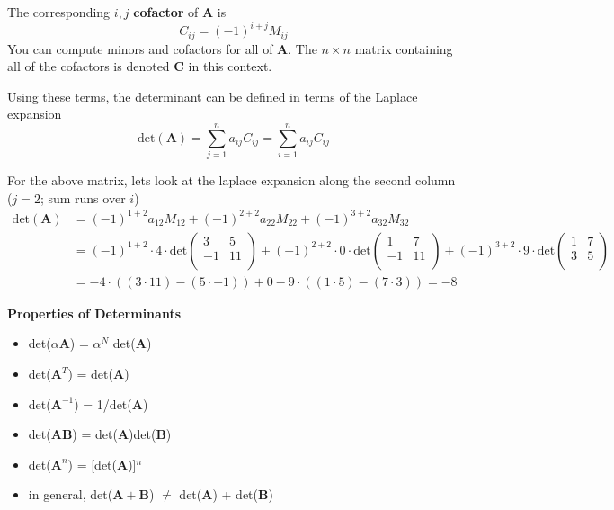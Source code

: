 \documentclass[12pt]{article}
\newcommand{\ve}[1]{\ensuremath{\mathbf{#1}}}
\begin{document}
The corresponding $i,j$ \textbf{cofactor} of $\ve{A}$ is
%
\begin{equation}
C_{ij} = (-1)^{i+j} M_{ij} \nonumber
\end{equation}
%
You can compute minors and cofactors for all of $\ve{A}$. The $n \times n$ matrix containing all of the cofactors is denoted $\ve{C}$ in this context.

Using these terms, the determinant can be defined in terms of the Laplace expansion
%
\begin{equation}
\text{det}(\ve{A}) = \sum_{j=1}^n a_{ij} C_{ij} = \sum_{i=1}^n a_{ij} C_{ij} \nonumber
\end{equation}

For the above matrix, lets look at the laplace expansion along the second column ($j = 2$; sum runs over $i$)
\begin{align}
\text{det}(\ve{A}) &= (-1)^{1+2} a_{12} M_{12} + (-1)^{2+2} a_{22} M_{22} + (-1)^{3+2} a_{32} M_{32} \nonumber \\
%
&= (-1)^{1+2} \cdot 4 \cdot \text{det}\begin{pmatrix}
        3 & 5 \\
        -1 & 11 \\ \end{pmatrix} + (-1)^{2+2} \cdot 0 \cdot \text{det}\begin{pmatrix} 
        1 & 7 \\
        -1 & 11 \\ \end{pmatrix} + (-1)^{3+2} \cdot 9 \cdot \text{det}\begin{pmatrix} 
        1 & 7 \\
        3 & 5 \\\end{pmatrix} \nonumber \\
%
&= -4 \cdot ((3 \cdot 11) - (5 \cdot -1)) + 0 -9 \cdot ((1 \cdot 5) - (7 \cdot 3)) = -8 \nonumber
\end{align}


\textbf{Properties of Determinants}
\begin{itemize}
\item det($\alpha\ve{A}$) = $\alpha^N$ det($\ve{A}$)

\item det($\ve{A}^T$) = det($\ve{A}$)

\item det($\ve{A}^{-1}$) = 1/det($\ve{A}$)

\item det($\ve{AB}$) = det($\ve{A}$)det($\ve{B}$)

\item det($\ve{A}^n$) = [det($\ve{A}$)]$^n$

\item in general, det($\ve{A + B}$) $\neq$ det($\ve{A}$) + det($\ve{B}$) 
\end{itemize}
\end{document}
